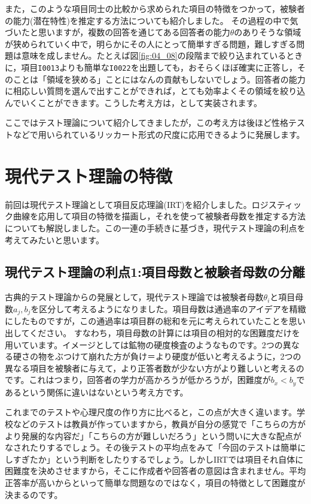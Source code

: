 \documentclass{ltjsbook}
\begin{document}
また，このような項目同士の比較から求められた項目の特徴をつかって，被験者の能力(潜在特性)を推定する方法についても紹介しました。
その過程の中で気づいたと思いますが，複数の回答を通じてある回答者の能力$\theta$のありそうな領域が狭められていく中で，明らかにその人にとって簡単すぎる問題，難しすぎる問題は意味を成しません。たとえば図\ref{fig:04_08}の段階まで絞り込まれているときに，項目\texttt{I0013}よりも簡単な\texttt{I0022}を出題しても，おそらくほぼ確実に正答し，そのことは「領域を狭める」ことにはなんの貢献もしないでしょう。回答者の能力に相応しい質問を選んで出すことができれば，とても効率よくその領域を絞り込んでいくことができます。こうした考え方は，として実装されます。

ここではテスト理論について紹介してきましたが，この考え方は後ほど性格テストなどで用いられているリッカート形式の尺度に応用できるように発展します。


\section{現代テスト理論の特徴}
前回は現代テスト理論として項目反応理論(IRT)を紹介しました。ロジスティック曲線を応用して項目の特徴を描画し，それを使って被験者母数を推定する方法についても解説しました。この一連の手続きに基づき，現代テスト理論の利点を考えてみたいと思います。
\subsection{現代テスト理論の利点1:項目母数と被験者母数の分離}
古典的テスト理論からの発展として，現代テスト理論では被験者母数$\theta_i$と項目母数$a_j, b_j$を区分して考えるようになりました。項目母数は通過率のアイデアを精緻にしたものですが，この通過率は項目群の総和を元に考えられていたことを思い出してください。
すなわち，項目母数の計算には項目の相対的な困難度だけを用いています。イメージとしては鉱物の硬度検査のようなものです。2つの異なる硬さの物をぶつけて崩れた方が負け＝より硬度が低いと考えるように，2つの異なる項目を被験者に与えて，より正答者数が少ない方がより難しいと考えるのです。これはつまり，回答者の学力が高かろうが低かろうが，困難度が$b_x < b_y$であるという関係に違いはないという考え方です。

これまでのテストや心理尺度の作り方に比べると，この点が大きく違います。学校などのテストは教員が作っていますから，教員が自分の感覚で「こちらの方がより発展的な内容だ」「こちらの方が難しいだろう」という問いに大きな配点がなされたりするでしょう。その後テストの平均点をみて「今回のテストは簡単にしすぎたか」という判断をしたりするでしょう。しかしIRTでは項目それ自体に困難度を決めさせますから，そこに作成者や回答者の意図は含まれません。平均正答率が高いからといって簡単な問題なのではなく，項目の特徴として困難度が決まるのです。
\end{document}
